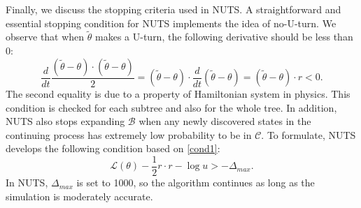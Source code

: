 \documentclass{article}
\begin{document}
\par Finally, we discuss the stopping criteria used in NUTS. A straightforward and essential stopping condition for NUTS implements the idea of no-U-turn. We observe that when $\tilde{\theta}$ makes a U-turn, the following derivative
should be less than 0:
\begin{equation}
\frac{d}{dt}\frac{(\tilde{\theta}-\theta)\cdot (\tilde{\theta}-\theta)}{2} = (\tilde{\theta}-\theta)\cdot\frac{d}{dt}(\tilde{\theta}-\theta)= (\tilde{\theta}-\theta)\cdot r < 0.
\label{cond2} \tag{C.2}
\end{equation}
%
The second equality is due to a property of Hamiltonian system in physics. This condition is checked for each subtree and also for the whole tree. %
In addition, NUTS also stops expanding $\mathcal{B}$ when any newly discovered states in the continuing process has extremely low probability to be in $\mathcal{C}$. To formulate, NUTS develops the following condition based on \eqref{cond1}:
\begin{equation}
\mathcal{L}(\theta) -\frac{1}{2}r\cdot r -\log u > -\Delta_{max}.
\label{cond3} \tag{C.3}
\end{equation}
\noindent In NUTS, $\Delta_{max}$ is set to 1000, so the algorithm continues as long as the simulation is moderately accurate.
\end{document}
